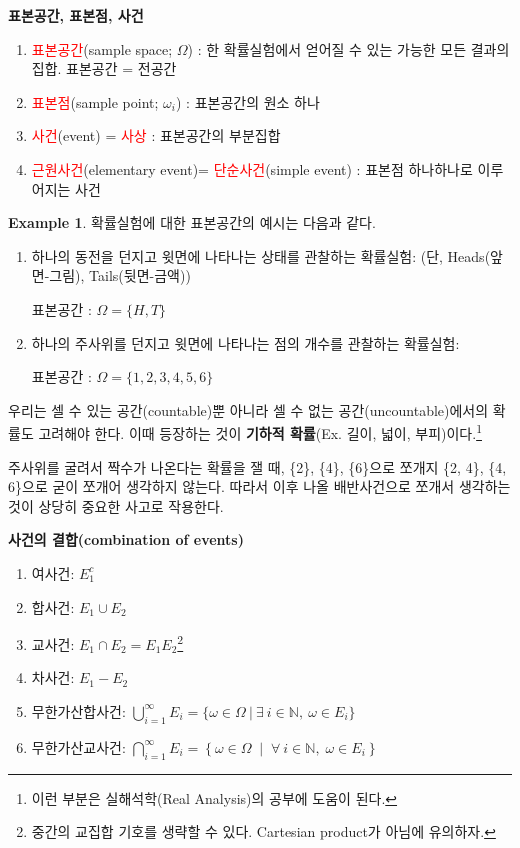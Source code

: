 \documentclass{article}
\theoremstyle{definition}
\newtheorem{example}[theorem]{Example}
\begin{document}
\noindent
\textbf{표본공간, 표본점, 사건}

\begin{enumerate}
    \item \textcolor{red}{표본공간}(sample space; $\Omega$) : 한 확률실험에서 얻어질 수 있는 가능한 모든 결과의 집합. 표본공간 = 전공간
    \item \textcolor{red}{표본점}(sample point; $\omega_i$) : 표본공간의 원소 하나
    \item \textcolor{red}{사건}(event) = \textcolor{red}{사상} : 표본공간의 부분집합
    \item \textcolor{red}{근원사건}(elementary event)= \textcolor{red}{단순사건}(simple event) : 표본점 하나하나로 이루어지는 사건
\end{enumerate}

\begin{example}
    확률실험에 대한 표본공간의 예시는 다음과 같다.

    \begin{enumerate}
        \item 하나의 동전을 던지고 윗면에 나타나는 상태를 관찰하는 확률실험: (단, Heads(앞면-그림), Tails(뒷면-금액))
        
        표본공간 : $\Omega = \{ H, T \}$

        \item 하나의 주사위를 던지고 윗면에 나타나는 점의 개수를 관찰하는 확률실험:
        
        표본공간 : $\Omega = \{1,2,3,4,5,6 \}$
    \end{enumerate}
\end{example}

\noindent
우리는 셀 수 있는 공간(countable)뿐 아니라 셀 수 없는 공간(uncountable)에서의 확률도 고려해야 한다. 이때 등장하는 것이 \textbf{기하적 확률}(Ex. 길이, 넓이, 부피)이다.\footnote{이런 부분은 실해석학(Real Analysis)의 공부에 도움이 된다.}

\vspace{4mm}\noindent
주사위를 굴려서 짝수가 나온다는 확률을 잴 때, \{2\}, \{4\}, \{6\}으로 쪼개지 \{2, 4\}, \{4, 6\}으로 굳이 쪼개어 생각하지 않는다. 따라서 이후 나올 배반사건으로 쪼개서 생각하는 것이 상당히 중요한 사고로 작용한다.

\newpage

\noindent
\textbf{사건의 결합(combination of events)}

\begin{enumerate}
    \item 여사건: $E_1^c$
    \item 합사건: $E_1 \cup E_2$
    \item 교사건: $E_1 \cap E_2 = E_1 E_2$\footnote{중간의 교집합 기호를 생략할 수 있다. Cartesian product가 아님에 유의하자.}
    \item 차사건: $E_1 - E_2$
    \item 무한가산합사건: $\bigcup_{i=1}^\infty E_i = \{ \omega \in \Omega \ | \ \exists \ i \in \mathbb{N}, \ \omega \in E_i \}$
    \item 무한가산교사건: $\bigcap_{i=1}^{\infty} E_i = \left\{ \omega \in \Omega \;\middle|\; \forall \ i \in \mathbb{N},\; \omega \in E_i \right\} $
\end{enumerate}
\end{document}

